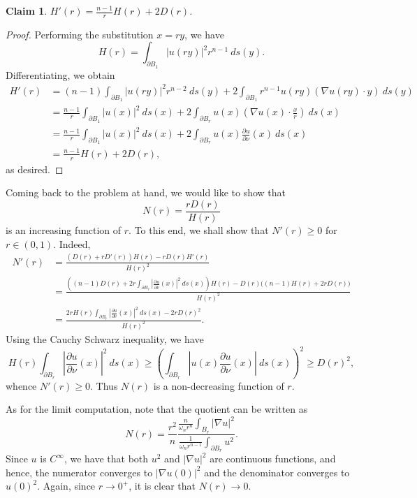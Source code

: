 \documentclass[10pt]{amsart}
\theoremstyle{thmstyle}
\newtheorem*{claim}{Claim}
\theoremstyle{defstyle}
\renewcommand{\ge}{\geqslant}
\begin{document}
\begin{claim}
    $\displaystyle H'(r) = \frac{n - 1}{r}H(r) + 2D(r)$.
\end{claim}
\begin{proof}
Performing the substitution $x = ry$, we have 
\begin{equation*}
    H(r) = \int_{\partial B_1}|u(ry)|^2 r^{n - 1}~ds(y).
\end{equation*}
Differentiating, we obtain 
\begin{align*}
    H'(r) &= (n - 1)\int_{\partial B_1}|u(ry)|^2 r^{n - 2}~ds(y) + 2\int_{\partial B_1} r^{n - 1}u(ry)\left(\nabla u(ry)\cdot y\right)~ds(y)\\
    &= \frac{n - 1}{r}\int_{\partial B_1}|u(x)|^2~ds(x) + 2\int_{\partial B_r}u(x)\left(\nabla u(x)\cdot\frac{x}{r}\right)~ds(x)\\
    &= \frac{n - 1}{r}\int_{\partial B_1}|u(x)|^2~ds(x) + 2\int_{\partial B_r}u(x)\frac{\partial u}{\partial\nu}(x)~ds(x)\\
    &= \frac{n - 1}{r} H(r) + 2D(r),
\end{align*}
as desired.
\end{proof}

Coming back to the problem at hand, we would like to show that 
\begin{equation*}
    N(r) = \frac{rD(r)}{H(r)}
\end{equation*}
is an increasing function of $r$. To this end, we shall show that $N'(r)\ge 0$ for $r\in (0, 1)$. Indeed,
\begin{align*}
    N'(r) &= \frac{\left(D(r) + rD'(r)\right)H(r) - rD(r)H'(r)}{H(r)^2}\\
    &= \frac{\left((n - 1)D(r) + 2r\int_{\partial B_r}\left|\frac{\partial u}{\partial\nu}(x)\right|^2~ds(x)\right)H(r) - D(r)\bigg((n - 1)H(r) + 2rD(r)\bigg)}{H(r)^2}\\
    &= \frac{2rH(r)\int_{\partial B_r}\left|\frac{\partial u}{\partial\nu}(x)\right|^2~ds(x) - 2rD(r)^2}{H(r)^2}.
\end{align*}
Using the Cauchy Schwarz inequality, we have 
\begin{equation*}
    H(r)\int_{\partial B_r}\left|\frac{\partial u}{\partial\nu}(x)\right|^2~ds(x)\ge\left(\int_{\partial B_r}\left|u(x)\frac{\partial u}{\partial\nu}(x)\right|~ds(x)\right)^2\ge D(r)^2,
\end{equation*}
whence $N'(r)\ge 0$. Thus $N(r)$ is a non-decreasing function of $r$.

As for the limit computation, note that the quotient can be written as 
\begin{equation*}
    N(r) = \frac{r^2}{n}\frac{\frac{n}{\omega_n r^n}\int_{B_r}|\nabla u|^2}{\frac{1}{\omega_n r^{n - 1}}\int_{\partial B_r} u^2}.
\end{equation*}
Since $u$ is $C^\infty$, we have that both $u^2$ and $|\nabla u|^2$ are continuous functions, and hence, the numerator converges to $|\nabla u(0)|^2$ and the denominator converges to $u(0)^2$. Again, since $r\to 0^+$, it is clear that $N(r)\to 0$.
\end{document}
